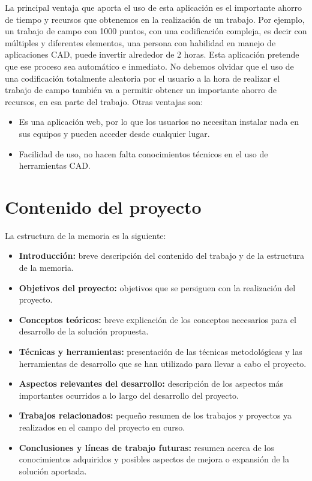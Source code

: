 La principal ventaja que aporta el uso de esta aplicación es el importante ahorro de tiempo y recursos que obtenemos en la realización de un trabajo. Por ejemplo, un trabajo de campo con 1000 puntos, con una codificación compleja, es decir con múltiples y diferentes elementos, una persona con habilidad en manejo de aplicaciones CAD, puede invertir alrededor de 2 horas. Esta aplicación pretende que ese proceso sea automático e inmediato. No debemos olvidar que el uso de una codificación totalmente aleatoria por el usuario a la hora de realizar el trabajo de campo también va a permitir obtener un importante ahorro de recursos, en esa parte del trabajo.
Otras ventajas son:
\begin{itemize}
	\item Es una aplicación web, por lo que los usuarios no necesitan instalar nada en sus equipos y pueden acceder desde cualquier lugar.
	\item Facilidad de uso, no hacen falta conocimientos técnicos en el uso de herramientas CAD.
\end{itemize}
\section{Contenido del proyecto}

La estructura de la memoria es la siguiente:

\begin{itemize}
	\item \textbf {Introducción:} breve descripción del contenido del trabajo y de la estructura de la memoria.
	\item \textbf {Objetivos del proyecto:} objetivos que se persiguen con la realización del proyecto.
	\item \textbf {Conceptos teóricos:} breve explicación de los conceptos necesarios para el desarrollo de la solución propuesta.
	\item \textbf {Técnicas y herramientas:} presentación de las técnicas metodológicas y las herramientas de desarrollo que se han utilizado para llevar a cabo el proyecto.
	\item \textbf {Aspectos relevantes del desarrollo:} descripción de los aspectos más importantes ocurridos a lo largo del desarrollo del proyecto.
	\item \textbf {Trabajos relacionados:} pequeño resumen de los trabajos y proyectos ya realizados en el campo del proyecto en curso.
	\item \textbf {Conclusiones y líneas de trabajo futuras:} resumen acerca de los conocimientos adquiridos y posibles aspectos de mejora o expansión de la solución aportada.
\end{itemize}

